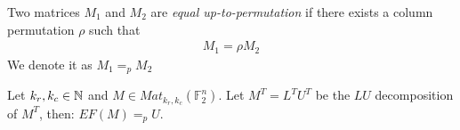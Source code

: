 \documentclass[11pt]{llncs}
\begin{document}
\begin{definition}
   Two matrices $M_1$ and $M_2$ are \textit{equal up-to-permutation} if there exists a column permutation $\rho$ such that
    \begin{align*}
        M_1 = \rho M_2
    \end{align*}
    We denote it as $M_1 =_p M_2$
\end{definition}

\begin{remark}\label{rem:rowEchelonForm}
    Let $k_r, k_c \in \mathbb{N}$ and $M\in Mat_{k_r,k_c}(\mathbb{F}_2^n)$. Let $M^T = L^TU^T$ be the $LU$ decomposition of $M^T$, then: $EF(M) =_p U$.
\end{remark}

\end{document}
